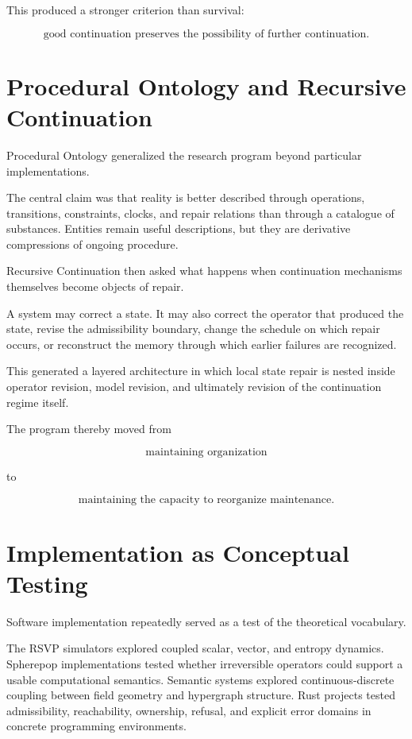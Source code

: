 \documentclass[11pt,oneside]{book}
\numberwithin{equation}{chapter}
\theoremstyle{definition}
\theoremstyle{plain}
\begin{document}
This produced a stronger criterion than survival:

\[
\text{good continuation preserves the possibility of further continuation}.
\]

\section{Procedural Ontology and Recursive Continuation}

Procedural Ontology generalized the research program beyond particular
implementations.

The central claim was that reality is better described through operations,
transitions, constraints, clocks, and repair relations than through a
catalogue of substances. Entities remain useful descriptions, but they are
derivative compressions of ongoing procedure.

Recursive Continuation then asked what happens when continuation mechanisms
themselves become objects of repair.

A system may correct a state. It may also correct the operator that
produced the state, revise the admissibility boundary, change the schedule
on which repair occurs, or reconstruct the memory through which earlier
failures are recognized.

This generated a layered architecture in which local state repair is nested
inside operator revision, model revision, and ultimately revision of the
continuation regime itself.

The program thereby moved from

\[
\text{maintaining organization}
\]

to

\[
\text{maintaining the capacity to reorganize maintenance}.
\]

\section{Implementation as Conceptual Testing}

Software implementation repeatedly served as a test of the theoretical
vocabulary.

The RSVP simulators explored coupled scalar, vector, and entropy dynamics.
Spherepop implementations tested whether irreversible operators could
support a usable computational semantics. Semantic systems explored
continuous-discrete coupling between field geometry and hypergraph
structure. Rust projects tested admissibility, reachability, ownership,
refusal, and explicit error domains in concrete programming environments.
\end{document}
